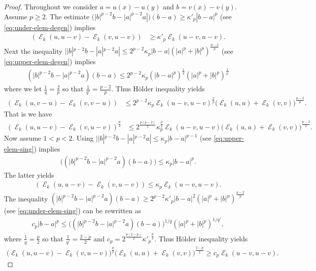 \documentclass[12pt, reqno]{amsart}%
\theoremstyle{plain}  %
\theoremstyle{definition}  %
\numberwithin{equation}{section}
\DeclareMathOperator{\cE}{\mathcal{E}}
\begin{document}
\begin{proof}
Throughout we consider $a= u(x)-u(y)$ and $b= v(x)-v(y). $ Assume  $p\geq 2$. The estimate  $(|b|^{p-2}b-|a|^{p-2}a|)(b-a)\geq \kappa'_p|b-a|^p$ (see \eqref{eq:under-elem-degen})  implies
\begin{align*}
(\cE_k(u,u-v)-\cE_k(v,u-v)) &\geq \kappa'_p\cE_k(u-v,u-v).
\end{align*}
Next the inequality  $||b|^{p-2}b-|a|^{p-2}a|\leq 2^{p-2}\kappa_p|b-a|(|a|^p+|b|^p)^{\frac{p-2}{p}}$ (see \eqref{eq:upper-elem-degen})  implies
\begin{align*}
(|b|^{p-2}b-|a|^{p-2}a)(b-a)\leq 2^{p-2}\kappa_p(|b-a|^p)^{\frac{1}{q}}(|a|^p+|b|^p)^{\frac{1}{q'}}
\end{align*}
where we let  $\frac{1}{q}= \frac{2}{p}$ so that $\frac{1}{q'}= \frac{p-2}{p}$. Thus H\"older inequality  yields
\begin{align*}
(\cE_k(u,v-u)-\cE_k(v, v-u)) &\leq 	2^{p-2}\kappa_p \cE_k(u-v,u-v)^{\frac{2}{p}}
\big( \cE_k(u,u)+\cE_k(v,v)\big)^{\frac{p-2}{p}}.
\end{align*}
That is we have
\begin{align*}
(\cE_k(u,u-v)-\cE_k(v,u-v))^{\frac{p}{2}}&\leq 2^{\frac{p(p-2)}{2}}\kappa_p^{\frac{p}{2}} \cE_k(u-v,u-v)\big(\cE_k(u,u)+\cE_k(v,v)\big)^{\frac{p-2}{2}}.
\end{align*}
Now assume $1<p<2$. Using $||b|^{p-2}b-|a|^{p-2}a|\leq \kappa_p|b-a|^{p-1}$ (see \eqref{eq:upper-elem-sing})  implies
\begin{align*}
\big((|b|^{p-2}b-|a|^{p-2}a)(b-a)\big)\leq \kappa_p|b-a|^p.
\end{align*}
The latter yields
\begin{align*}
(\cE_k(u,u-v)-\cE_k(v,u-v)) \leq \kappa_p\cE_k(u-v,u-v).
\end{align*}
The inequality
$(|b|^{p-2}b-|a|^{p-2}a)(b-a)\geq 2^{p-2} \kappa'_p |b-a|^2(|a|^p+|b|^p)^{\frac{p-2}{p}}$ (see \eqref{eq:under-elem-sing}) can be rewritten as
%
\begin{align*}
c_p |b-a|^p\leq
\big((|b|^{p-2}b-|a|^{p-2}a)(b-a)\big)^{1/q} (|a|^p+|b|^p)^{1/q'},
\end{align*}
where $\frac{1}{q}= \frac{p}{2}$ so that $\frac{1}{q'}= \frac{2-p}{2}$ and $c_p=2^{\frac{p(2-p)}{2}}{\kappa'_p}^{\frac{p}{2}} $.
Thus H\"older inequality  yields
\begin{align*}
\big(\cE_k(u,u-v)-\cE_k(v,u-v)\big)^{\frac{p}{2}}
\big( \cE_k(u,u)+\cE_k(v,v)\big)^{\frac{2-p}{2}}
\geq c_p \cE_k(u-v,u-v).
\end{align*}
\end{proof}
\end{document}

